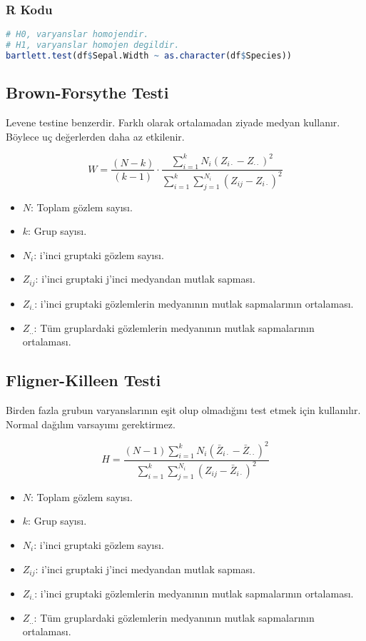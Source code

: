 \subsubsection{R Kodu}

\begin{lstlisting}[language=R]
# H0, varyanslar homojendir.
# H1, varyanslar homojen degildir.
bartlett.test(df$Sepal.Width ~ as.character(df$Species))
\end{lstlisting}

\newpage

\subsection{Brown-Forsythe Testi}
Levene testine benzerdir. Farklı olarak ortalamadan ziyade medyan kullanır. Böylece uç değerlerden daha az etkilenir.

\[
W = \frac{(N - k)}{(k - 1)} \cdot \frac{\sum_{i=1}^{k} N_i (Z_{i \cdot} - Z_{\cdot \cdot})^2}{\sum_{i=1}^{k} \sum_{j=1}^{N_i} (Z_{ij} - Z_{i \cdot})^2}
\]

\begin{itemize}
	\item $N$: Toplam gözlem sayısı.
	\item $k$: Grup sayısı.
	\item $N_i$: i'inci gruptaki gözlem sayısı.
	\item $Z_{ij}$: i'inci gruptaki j'inci medyandan mutlak sapması.
	\item $Z_{i.}$: i'inci gruptaki gözlemlerin medyanının mutlak sapmalarının ortalaması.
	\item $Z_{..}$: Tüm gruplardaki gözlemlerin medyanının mutlak sapmalarının ortalaması.
\end{itemize}

\newpage

\subsection{Fligner-Killeen Testi}
Birden fazla grubun varyanslarının eşit olup olmadığını test etmek için kullanılır. Normal dağılım varsayımı gerektirmez. 

\[
H = \frac{(N - 1) \sum_{i=1}^{k} N_i (\bar{Z}_{i \cdot} - \bar{Z}_{\cdot \cdot})^2}{\sum_{i=1}^{k} \sum_{j=1}^{N_i} (Z_{ij} - \bar{Z}_{i \cdot})^2}
\]

\begin{itemize}
	\item $N$: Toplam gözlem sayısı.
	\item $k$: Grup sayısı.
	\item $N_i$: i'inci gruptaki gözlem sayısı.
	\item $Z_{ij}$: i'inci gruptaki j'inci medyandan mutlak sapması.
	\item $Z_{i.}$: i'inci gruptaki gözlemlerin medyanının mutlak sapmalarının ortalaması.
	\item $Z_{..}$: Tüm gruplardaki gözlemlerin medyanının mutlak sapmalarının ortalaması.
\end{itemize}

